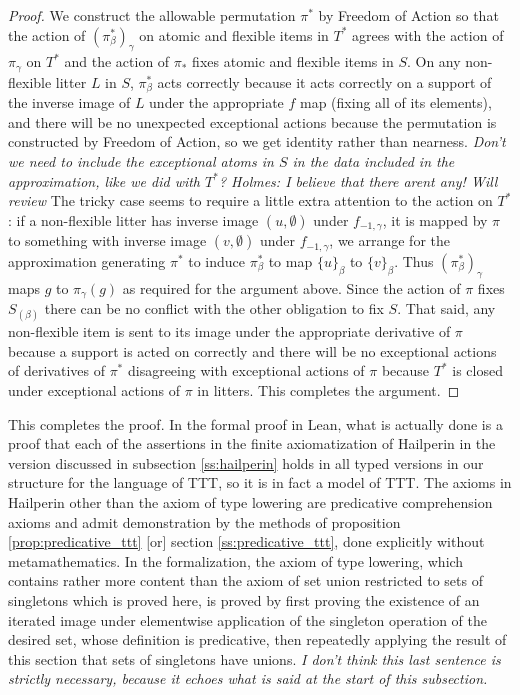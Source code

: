 \documentclass[112pt]{article}
\theoremstyle{definition}
\theoremstyle{remark}
\newcommand{\rk}[1]{{\color{blue}\sl #1}}
\begin{document}
\begin{proof}
We construct the allowable permutation $\pi^*$ by Freedom of Action so that the action of $(\pi^*_\beta)_\gamma$ on atomic and flexible items in $T^*$ agrees with the action of $\pi_\gamma$ on $T^*$
and the action of $\pi_*$ fixes atomic and flexible items in $S$.  On any non-flexible litter $L$ in $S$, $\pi^*_\beta$ acts correctly because it acts correctly on a support of the inverse image of $L$ under the appropriate $f$ map (fixing all of its elements), and there will be no unexpected exceptional actions because the permutation is constructed by Freedom of Action, so we get identity rather than nearness. \rk{Don't we need to include the exceptional atoms in $S$ in the data included in the approximation, like we did with $T^*$?  Holmes:  I believe that there arent any!  Will review}
The tricky case seems to require a little extra attention to the action on $T^*$:  if a non-flexible litter has inverse image $(u, \emptyset)$ under $f_{-1,\gamma}$, it is mapped by $\pi$ to something with inverse image $(v, \emptyset)$ under $f_{-1,\gamma}$, we arrange for the
approximation generating $\pi^*$ to induce
$\pi^*_\beta$ to map $\{u\}_\beta$ to $\{v\}_\beta$.  %
Thus  $(\pi^*_\beta)_\gamma$ maps $g$ to $\pi_\gamma(g)$ as required for the argument above.  Since the action of $\pi$ fixes $S_{(\beta)}$ there can be no conflict with the other obligation to fix $S$.  That said, any non-flexible item is sent to its image under the appropriate derivative of $\pi$ because
a support is acted on correctly and there will be no exceptional actions of derivatives of $\pi^*$ disagreeing with exceptional actions of $\pi$ because $T^*$ is closed under exceptional actions of $\pi$ in litters.  This completes the argument.
\end{proof}

This completes the proof.  In the formal proof in Lean, what is actually done is a proof that each of the assertions in the finite axiomatization of Hailperin in the version discussed in {subsection \ref{ss:hailperin}}  holds in all typed versions in our structure for the language of TTT, so it is in fact a model of TTT.  The axioms in Hailperin other than the axiom of type lowering are predicative comprehension axioms and
admit demonstration by the methods of {proposition \ref{prop:predicative_ttt} [or] section \ref{ss:predicative_ttt}}, done explicitly without metamathematics.  In the formalization, the axiom of type lowering, which contains rather more content than the axiom of set union restricted to sets of singletons which is proved here, is proved by first proving the existence of an iterated image under elementwise application of the singleton operation of the desired set, whose definition is predicative, then repeatedly applying the result of this section that sets of singletons have unions. \rk{I don't think this last sentence is strictly necessary, because it echoes what is said at the start of this subsection.}
\end{document}
